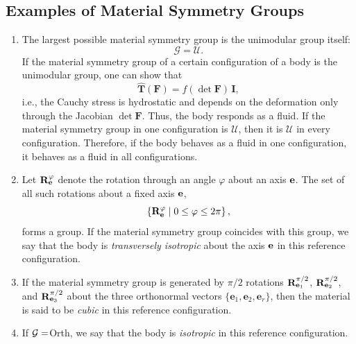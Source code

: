 \subsection{ Examples of Material Symmetry Groups}
\begin{enumerate}
	\item The largest possible material symmetry group is the unimodular group itself:
	\[
	\mathcal{G} = \mathcal{U}.
	\]
	If the material symmetry group of a certain configuration of a body is the unimodular group, one can show that
	\[
	\widehat{\mathbf{T}}(\mathbf{F}) = f(\det \mathbf{F}) \, \mathbf{I},
	\]
	i.e., the Cauchy stress is hydrostatic and depends on the deformation only through the Jacobian $\det \mathbf{F}$. Thus, the body responds as a fluid. If the material symmetry group in one configuration is $\mathcal{U}$, then it is $\mathcal{U}$ in every configuration. Therefore, if the body behaves as a fluid in one configuration, it behaves as a fluid in all configurations.
\item Let $\mathbf{R}^\varphi_{\mathbf{e}}$ denote the rotation through an angle $\varphi$ about an axis $\mathbf{e}$. The set of all such rotations about a fixed axis $\mathbf{e}$,
\[
\left\{ \mathbf{R}^\varphi_{\mathbf{e}} \mid 0 \leq \varphi \leq 2\pi \right\},
\]
forms a group. If the material symmetry group coincides with this group, we say that the body is \textit{transversely isotropic} about the axis $\mathbf{e}$ in this reference configuration.
\item If the material symmetry group is generated by $\pi/2$ rotations $\mathbf{R}^{\pi/2}_{\mathbf{e}_1}$, $\mathbf{R}^{\pi/2}_{\mathbf{e}_2}$, and $\mathbf{R}^{\pi/2}_{\mathbf{e}_3}$ about the three orthonormal vectors $\{ \mathbf{e}_1, \mathbf{e}_2, \mathbf{e}_r \}$, then the material is said to be \textit{cubic} in this reference configuration.
\item If $\mathcal{G}=$Orth, we say that the body is \textit{isotropic} in this reference configuration.
\end{enumerate}


